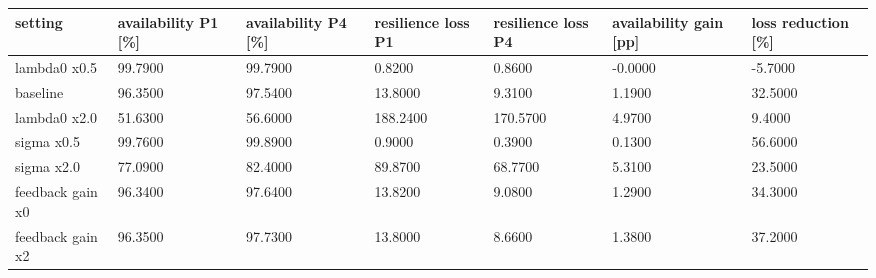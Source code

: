\begin{tabular}{lllllll}
\toprule
setting & availability P1 [\%] & availability P4 [\%] & resilience loss P1 & resilience loss P4 & availability gain [pp] & loss reduction [\%] \\
\midrule
lambda0 x0.5 & 99.7900 & 99.7900 & 0.8200 & 0.8600 & -0.0000 & -5.7000 \\
baseline & 96.3500 & 97.5400 & 13.8000 & 9.3100 & 1.1900 & 32.5000 \\
lambda0 x2.0 & 51.6300 & 56.6000 & 188.2400 & 170.5700 & 4.9700 & 9.4000 \\
sigma x0.5 & 99.7600 & 99.8900 & 0.9000 & 0.3900 & 0.1300 & 56.6000 \\
sigma x2.0 & 77.0900 & 82.4000 & 89.8700 & 68.7700 & 5.3100 & 23.5000 \\
feedback gain x0 & 96.3400 & 97.6400 & 13.8200 & 9.0800 & 1.2900 & 34.3000 \\
feedback gain x2 & 96.3500 & 97.7300 & 13.8000 & 8.6600 & 1.3800 & 37.2000 \\
\bottomrule
\end{tabular}
